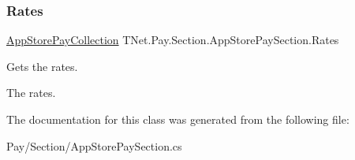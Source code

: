\subsubsection{\texorpdfstring{Rates}{Rates}}
{\footnotesize\ttfamily \mbox{\hyperlink{class_t_net_1_1_pay_1_1_section_1_1_app_store_pay_collection}{App\+Store\+Pay\+Collection}} T\+Net.\+Pay.\+Section.\+App\+Store\+Pay\+Section.\+Rates\hspace{0.3cm}{\ttfamily [get]}}



Gets the rates. 

The rates.

The documentation for this class was generated from the following file\+:\begin{DoxyCompactItemize}
\item 
Pay/\+Section/App\+Store\+Pay\+Section.\+cs\end{DoxyCompactItemize}

